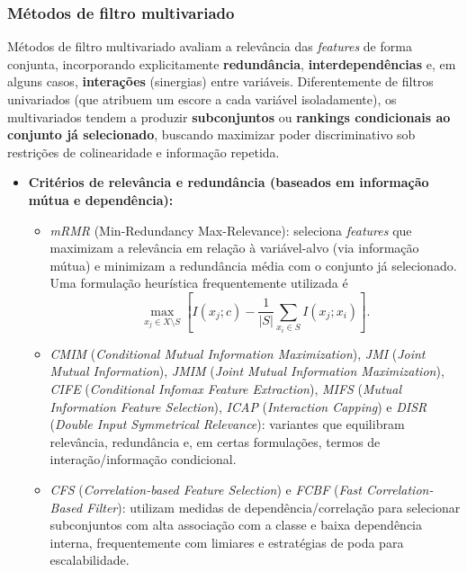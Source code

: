 \subsubsection*{Métodos de filtro multivariado}
Métodos de filtro multivariado avaliam a relevância das \emph{features} de forma conjunta, incorporando explicitamente \textbf{redundância}, \textbf{interdependências} e, em alguns casos, \textbf{interações} (sinergias) entre variáveis. Diferentemente de filtros univariados (que atribuem um escore a cada variável isoladamente), os multivariados tendem a produzir \textbf{subconjuntos} ou \textbf{rankings condicionais ao conjunto já selecionado}, buscando maximizar poder discriminativo sob restrições de colinearidade e informação repetida. \cite{Theng2024,Dhal2022,EBRAHIMIWARKIANI2025129372}

\begin{itemize}
    \item \textbf{Critérios de relevância e redundância (baseados em informação mútua e dependência):}
    \begin{itemize}
        \item \emph{mRMR} (Min-Redundancy Max-Relevance): seleciona \emph{features} que maximizam a relevância em relação à variável-alvo (via informação mútua) e minimizam a redundância média com o conjunto já selecionado. Uma formulação heurística frequentemente utilizada é
        \begin{equation}
            \max_{x_j \in X\setminus S}\left[ I(x_j;c) - \frac{1}{|S|}\sum_{x_i\in S} I(x_j;x_i) \right].
        \end{equation}
        \item \emph{CMIM} (\emph{Conditional Mutual Information Maximization}), \emph{JMI} (\emph{Joint Mutual Information}), \emph{JMIM} (\emph{Joint Mutual Information Maximization}), \emph{CIFE} (\emph{Conditional Infomax Feature Extraction}), \emph{MIFS} (\emph{Mutual Information Feature Selection}), \emph{ICAP} (\emph{Interaction Capping}) e \emph{DISR} (\emph{Double Input Symmetrical Relevance}): variantes que equilibram relevância, redundância e, em certas formulações, termos de interação/informação condicional. \cite{Theng2024,Dhal2022}
        \item \emph{CFS} (\emph{Correlation-based Feature Selection}) e \emph{FCBF} (\emph{Fast Correlation-Based Filter}): utilizam medidas de dependência/correlação para selecionar subconjuntos com alta associação com a classe e baixa dependência interna, frequentemente com limiares e estratégias de poda para escalabilidade. \cite{Theng2024,Dhal2022}
    \end{itemize}


\end{itemize}
